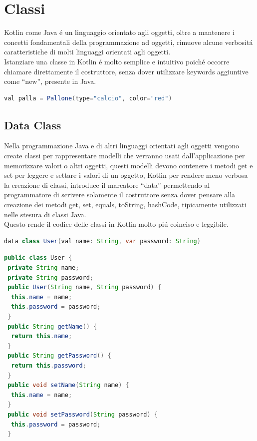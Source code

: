\section{Classi}
Kotlin come Java \'e un linguaggio orientato agli oggetti, oltre a mantenere i concetti fondamentali della programmazione ad oggetti, rimuove alcune verbosit\'a caratteristiche di molti linguaggi orientati agli oggetti.\\
Istanziare una classe in Kotlin \'e molto semplice e intuitivo poich\'e occorre chiamare direttamente il costruttore, senza dover utilizzare keywords aggiuntive come ``new'', presente in Java.

\begin{lstlisting}[language=java,caption={Esempio classe in Kotlin}]
val palla = Pallone(type="calcio", color="red")
\end{lstlisting}



\subsection{Data Class}

Nella programmazione Java e di altri linguaggi orientati agli oggetti vengono create classi per rappresentare modelli che verranno usati dall'applicazione per memorizzare valori o altri oggetti, questi modelli devono contenere i metodi get e set per leggere e settare i valori di un oggetto, Kotlin per rendere meno verbosa la creazione di classi, introduce il marcatore ``data'' permettendo al programmatore di scrivere solamente il costruttore senza dover pensare alla creazione dei metodi get, set, equals, toString, hashCode, tipicamente utilizzati nelle stesura di classi Java.\\
Questo rende il codice delle classi in Kotlin molto pi\'u coinciso e leggibile.

\begin{lstlisting}[language=java,caption={Esempio Data Class in Kotlin}]
data class User(val name: String, var password: String)
\end{lstlisting}

\begin{lstlisting}[language=java,caption={Esempio classe in Java}]
public class User {
 private String name;
 private String password;
 public User(String name, String password) {
  this.name = name;
  this.password = password;
 }
 public String getName() {
  return this.name;
 }
 public String getPassword() {
  return this.password;
 }
 public void setName(String name) {
  this.name = name;
 }
 public void setPassword(String password) {
  this.password = password;
 }
\end{lstlisting}





